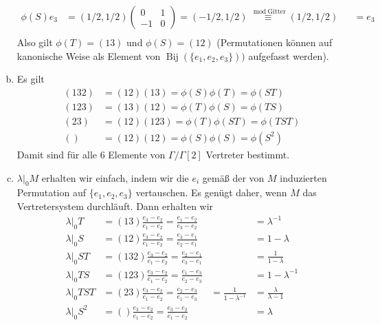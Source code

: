 \documentclass{article}
\begin{document}
\begin{enumerate}[(a)]
\begin{align*}
      \phi(S)e_3 &= (1/2, 1/2)\begin{pmatrix}
        0 & 1\\
        -1 & 0
      \end{pmatrix} = (-1/2, 1/2) \overset{\mod \text{Gitter}}{\equiv}  (1/2, 1/2) &&= e_3\\
    \end{align*}
    Also gilt $\phi(T) = (13)$ und $\phi(S) = (12)$ (Permutationen können auf kanonische Weise als Element von $\operatorname{Bij}(\{e_1, e_2, e_3\}))$ aufgefasst werden).
    \item Es gilt 
    \begin{align*}
      (132) &= (12)(13) = \phi(S)\phi(T) = \phi(ST)\\
      (123) &= (13)(12) = \phi(T)\phi(S) = \phi(TS)\\
      (23)  &= (12)(123) = \phi(T)\phi(ST) = \phi(TST)\\
      () &= (12)(12) = \phi(S)\phi(S) = \phi(S^2)
    \end{align*}
    Damit sind für alle 6 Elemente von $\Gamma/\Gamma[2]$ Vertreter bestimmt.
    \item $\lambda|_0 M$ erhalten wir einfach, indem wir die $e_i$ gemäß der von $M$ induzierten Permutation auf $\{e_1, e_2, e_3\}$ vertauschen. Es genügt daher, wenn $M$ das Vertretersystem durchläuft. Dann erhalten wir
    \begin{align*}
      \lambda|_0 T &= (13)\frac{e_3 - e_2}{e_1 - e_2} = \frac{e_1 - e_2}{e_3-e_2} &&= \lambda^{-1}\\
      \lambda|_0 S &= (12)\frac{e_3 - e_2}{e_1 - e_2} = \frac{e_3 - e_1}{e_2-e_1} &&= 1- \lambda\\
      \lambda|_0 ST &= (132)\frac{e_3 - e_2}{e_1 - e_2} = \frac{e_2 - e_1}{e_3-e_1} &&= \frac{1}{1-\lambda}\\
      \lambda|_0 TS &= (123)\frac{e_3 - e_2}{e_1 - e_2} = \frac{e_1 - e_3}{e_2-e_3} &&= 1- \lambda^{-1}\\
      \lambda|_0 TST &= (23)\frac{e_3 - e_2}{e_1 - e_2} = \frac{e_2 - e_3}{e_1-e_3} &= \frac{1}{1-\lambda^{-1}} &= \frac{\lambda}{\lambda - 1}\\
      \lambda|_0 S^2 &= ()\frac{e_3 - e_2}{e_1 - e_2} = \frac{e_3 - e_2}{e_1-e_2} &&= \lambda\\
    \end{align*}
  \end{enumerate}
\end{document}
